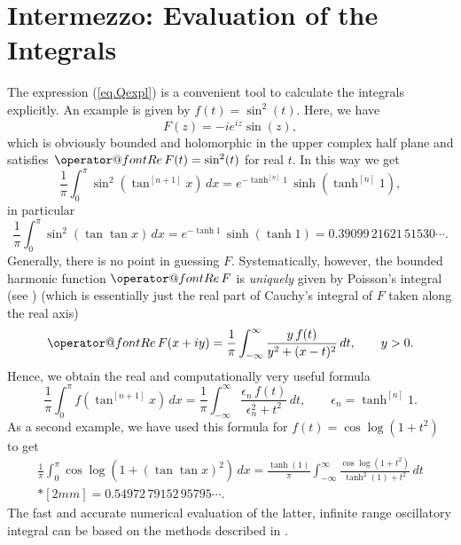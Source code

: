 \documentclass[10pt]{amsart}
\makeatletter
\renewcommand{\Re}{{\operator@font Re\,}}
\makeatother
\begin{document}
\section{Intermezzo: Evaluation of the Integrals}
\noindent
The expression (\ref{eq.Qexpl}) is a convenient tool to calculate the integrals explicitly. An example is given by $f(t) = \sin^2(t)$. Here,
we have
\[
F(z) = -i e^{iz} \sin(z),
\]
which is obviously bounded and holomorphic in the upper complex half plane and satisfies $\Re F(t) = \sin^2(t)$ for real $t$. In this way we get
\[
\frac{1}{\pi} \int_0^\pi \sin^2(\tan^{[n+1]}x)\,dx = e^{-\tanh^{[n]}1} \,\sinh (\tanh^{[n]}1),
\]
in particular
\begin{equation}\label{eq.schmelz}
\frac{1}{\pi} \int_0^\pi \sin^2(\tan\tan x)\,dx = e^{-\tanh 1} \,\sinh (\tanh 1) = 0.39099\,21621\,51530 \cdots .
\end{equation}
Generally, there is no point in guessing $F$. Systematically, however, the bounded harmonic function $\Re F$ is \emph{uniquely} given by Poisson's integral (see \cite[(15.4-3)]{Hen}) (which is
essentially just the real part of Cauchy's integral of $F$ taken along the real axis)
\[
\Re F(x+i y)  = \frac{1}{\pi} \int_{-\infty}^\infty \frac{y\, f(t)}{y^2 + (x-t)^2}\,dt,\qquad y>0.
\]
Hence, we obtain the real and computationally very useful formula
\begin{equation}\label{eq.real}
{\frac{1}{\pi} \int_0^\pi f(\tan^{[n+1]}x)\,dx = \frac{1}{\pi} \int_{-\infty}^\infty \frac{ \epsilon_n\,f(t)}{\epsilon_n^2 + t^2}\,dt,\qquad \epsilon_n = \tanh^{[n]}1.}
\end{equation}
As a second example, we have used this formula for $f(t)=\cos\log(1+t^2)$ to get
\begin{multline*}
\frac{1}{\pi} \int_0^\pi \cos\log(1+(\tan\tan x)^2)\,dx = \frac{\tanh(1)}{\pi} \int_{-\infty}^\infty \frac{ \cos\log(1+t^2)}{\tanh^2(1) + t^2}\,dt \\*[2mm] = 0.54972\,79152\,95795 \cdots .
\end{multline*}
The fast and accurate numerical evaluation of the latter, infinite range oscillatory integral can be based on the methods described in \cite[Chap.~1]{Chal}.

\medskip
\end{document}
